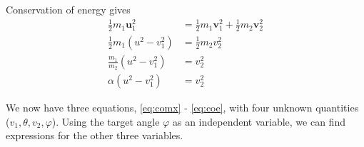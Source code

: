 \documentclass[twoside,english]{uiofysmaster/uiofysmaster}
\let\orgautoref\autoref
\renewcommand{\autoref}
        {%
		 \def\sectionautorefname{Section}%
		 \def\subsectionautorefname{Section}%
		 \def\subsubsectionautorefname{Section}%
		 \def\chapterautorefname{Chapter}%
          \orgautoref}
\begin{document}
\begin{appendices}
Conservation of energy gives
\begin{align}\label{eq:coe}
	\tfrac{1}{2} m_1 \boldsymbol{u}_1^2 &= \tfrac{1}{2} m_1 \boldsymbol{v}_1^2 + \tfrac{1}{2} m_2 \boldsymbol{v}_2^2 \nonumber\\
	\tfrac{1}{2} m_1 (u^2 - v_1^2) &= \tfrac{1}{2} m_2 v_2^2 \nonumber\\
	\frac{m_1}{m_2} (u^2 - v_1^2) &= v_2^2 \nonumber\\
	\alpha (u^2 - v_1^2) &= v_2^2
\end{align}

We now have three equations, \autoref{eq:comx} - \autoref{eq:coe}, with four unknown quantities ($v_1, \theta, v_2, \varphi$). 
Using the target angle $\varphi$ as an independent variable, we can find expressions for the other three variables. 


\end{appendices}
\end{document}
